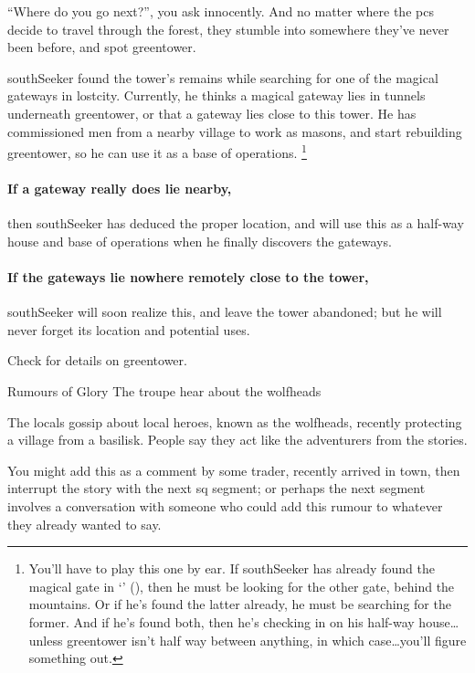 ``Where do you go next?'', you ask innocently.
And no matter where the \glspl{pc} decide to travel through the forest, they stumble into somewhere they've never been before, and spot \gls{greentower}.

\begin{exampletext}
  \Gls{southSeeker} found the tower's remains while searching for one of the magical gateways in \gls{lostcity}.
  Currently, he thinks a magical gateway lies in tunnels underneath \gls{greentower}, or that a gateway lies close to this tower.
  He has commissioned men from a nearby \gls{village} to work as masons, and start rebuilding \gls{greentower}, so he can use it as a base of operations.%
  \footnote{You'll have to play this one by ear.
  If \gls{southSeeker} has already found the magical gate in `' (), then he must be looking for the other gate, behind the mountains.
  Or if he's found the latter already, he must be searching for the former.
  And if he's found both, then he's checking in on his half-way house\ldots unless \gls{greentower} isn't half way between anything, in which case\ldots you'll figure something out.}
\end{exampletext}

\paragraph{If a gateway really does lie nearby,}
then \gls{southSeeker} has deduced the proper location, and will use this as a half-way house and base of operations when he finally discovers the gateways.

\paragraph{If the gateways lie nowhere remotely close to the tower,}
\gls{southSeeker} will soon realize this, and leave the tower abandoned; but he will never forget its location and potential uses.

Check  for details on \gls{greentower}.

{\squash Rumours of Glory}%
{The troupe hear about the \glspl{wolfhead}}%

The locals gossip about local heroes, known as the \glspl{wolfhead}, recently protecting a \gls{village} from a basilisk.
People say they act like the adventurers from the stories.

You might add this as a comment by some trader, recently arrived in town, then interrupt the story with the next \gls{sq} \gls{segment}; or perhaps the next \gls{segment} involves a conversation with someone who could add this rumour to whatever they already wanted to say.

